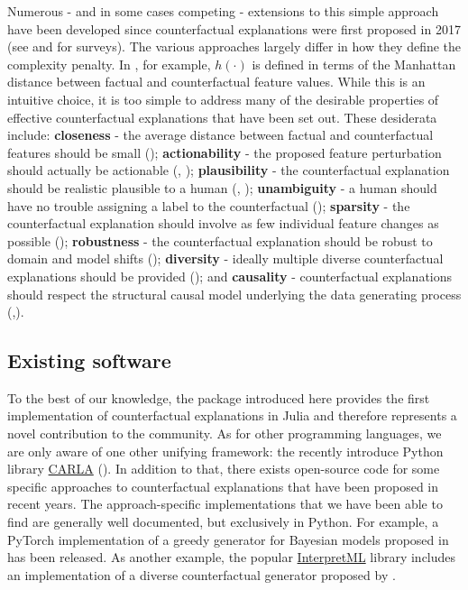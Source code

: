 \documentclass[
  letterpaper,
  DIV=11,
  numbers=noendperiod]{scrartcl}
\begin{document}
Numerous - and in some cases competing - extensions to this simple
approach have been developed since counterfactual explanations were
first proposed in 2017 (see \cite{verma2020counterfactual} and
\cite{karimi2020survey} for surveys). The various approaches largely
differ in how they define the complexity penalty. In
\cite{wachter2017counterfactual}, for example, \(h(\cdot)\) is defined
in terms of the Manhattan distance between factual and counterfactual
feature values. While this is an intuitive choice, it is too simple to
address many of the desirable properties of effective counterfactual
explanations that have been set out. These desiderata include:
\textbf{closeness} - the average distance between factual and
counterfactual features should be small
(\cite{wachter2017counterfactual}); \textbf{actionability} - the
proposed feature perturbation should actually be actionable
(\cite{ustun2019actionable}, \cite{poyiadzi2020face});
\textbf{plausibility} - the counterfactual explanation should be
realistic plausible to a human (\cite{joshi2019realistic},
\cite{schut2021generating}); \textbf{unambiguity} - a human should have
no trouble assigning a label to the counterfactual
(\cite{schut2021generating}); \textbf{sparsity} - the counterfactual
explanation should involve as few individual feature changes as possible
(\cite{schut2021generating}); \textbf{robustness} - the counterfactual
explanation should be robust to domain and model shifts
(\cite{upadhyay2021robust}); \textbf{diversity} - ideally multiple
diverse counterfactual explanations should be provided
(\cite{mothilal2020explaining}); and \textbf{causality} - counterfactual
explanations should respect the structural causal model underlying the
data generating process
(\cite{karimi2020algorithmic},\cite{karimi2021algorithmic}).

\hypertarget{existing-software}{%
\subsection{Existing software}\label{existing-software}}

To the best of our knowledge, the package introduced here provides the
first implementation of counterfactual explanations in Julia and
therefore represents a novel contribution to the community. As for other
programming languages, we are only aware of one other unifying
framework: the recently introduce Python library
\href{https://carla-counterfactual-and-recourse-library.readthedocs.io/en/latest/?badge=latest}{CARLA}
(\cite{pawelczyk2021carla}). In addition to that, there exists
open-source code for some specific approaches to counterfactual
explanations that have been proposed in recent years. The
approach-specific implementations that we have been able to find are
generally well documented, but exclusively in Python. For example, a
PyTorch implementation of a greedy generator for Bayesian models
proposed in \cite{schut2021generating} has been released. As another
example, the popular \href{https://github.com/interpretml}{InterpretML}
library includes an implementation of a diverse counterfactual generator
proposed by \cite{mothilal2020explaining}.
\end{document}
